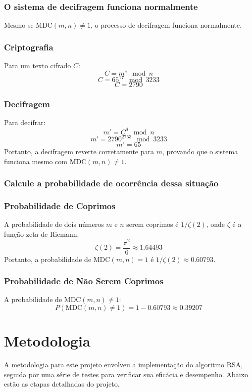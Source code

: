 \documentclass[a4paper,12pt]{article}
\begin{document}
\subsubsection*{O sistema de decifragem funciona normalmente}
Mesmo se \( \text{MDC}(m, n) \neq 1 \), o processo de decifragem funciona normalmente.

\subsubsection*{Criptografia}
Para um texto cifrado \( C \):
\[
C = m^e \mod n
\]
\[
C = 65^{17} \mod 3233
\]
\[
C = 2790
\]

\subsubsection*{Decifragem}
Para decifrar:
\[
m' = C^d \mod n
\]
\[
m' = 2790^{2753} \mod 3233
\]
\[
m' = 65
\]
Portanto, a decifragem reverte corretamente para \( m \), provando que o sistema funciona mesmo com \( \text{MDC}(m, n) \neq 1 \).

\subsubsection*{Calcule a probabilidade de ocorrência dessa situação}
\subsubsection*{Probabilidade de Coprimos}
A probabilidade de dois números \( m \) e \( n \) serem coprimos é \( 1/\zeta(2) \), onde \( \zeta \) é a função zeta de Riemann.
\[
\zeta(2) = \frac{\pi^2}{6} \approx 1.64493
\]
Portanto, a probabilidade de \( \text{MDC}(m, n) = 1 \) é \( 1/\zeta(2) \approx 0.60793 \).

\subsubsection*{Probabilidade de Não Serem Coprimos}
A probabilidade de \( \text{MDC}(m, n) \neq 1 \):
\[
P(\text{MDC}(m, n) \neq 1) = 1 - 0.60793 \approx 0.39207
\]

\section*{Metodologia}
A metodologia para este projeto envolveu a implementação do algoritmo RSA, seguida por uma série de testes para verificar sua eficácia e desempenho. Abaixo estão as etapas detalhadas do projeto.
\end{document}
